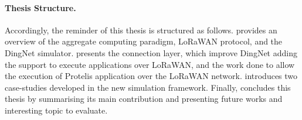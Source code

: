 %
\paragraph{Thesis Structure.} %
Accordingly, the reminder of this thesis is structured as follows.
%
 provides an overview of the aggregate computing paradigm, \mbox{LoRaWAN} protocol, and the DingNet simulator.
 presents the connection layer, which improve DingNet adding the support to execute applications over LoRaWAN, and the work done to allow the execution of Protelis application over the LoRaWAN network.
%  
 introduces two case-studies developed in the new simulation framework.
% 
Finally,  concludes this thesis by summarising its main contribution and presenting future works and interesting topic to evaluate.